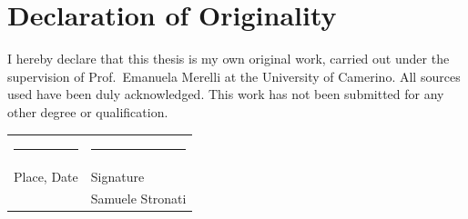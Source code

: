 \chapter*{Declaration of Originality}

I hereby declare that this thesis is my own original work, carried out under the supervision of Prof.\ Emanuela Merelli at the University of Camerino. All sources used have been duly acknowledged. This work has not been submitted for any other degree or qualification.

\vspace{4cm}

\noindent
\begin{tabular}{@{}p{6cm}p{6cm}@{}}
\rule{5.5cm}{0.4pt} & \rule{5.5cm}{0.4pt} \\
Place, Date & Signature \\
 & Samuele Stronati \\
\end{tabular}
